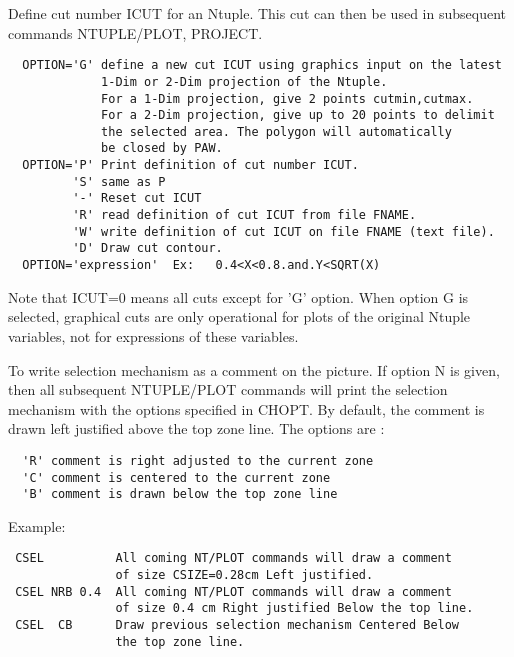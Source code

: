 \BEGARG
{}
\ENDARG
\BEGTEXT
Define cut number ICUT for an Ntuple.
This cut can then be used
in subsequent commands NTUPLE/PLOT, PROJECT.
\begin{verbatim}
  OPTION='G' define a new cut ICUT using graphics input on the latest
             1-Dim or 2-Dim projection of the Ntuple.
             For a 1-Dim projection, give 2 points cutmin,cutmax.
             For a 2-Dim projection, give up to 20 points to delimit
             the selected area. The polygon will automatically
             be closed by PAW.
  OPTION='P' Print definition of cut number ICUT.
         'S' same as P
         '-' Reset cut ICUT
         'R' read definition of cut ICUT from file FNAME.
         'W' write definition of cut ICUT on file FNAME (text file).
         'D' Draw cut contour.
  OPTION='expression'  Ex:   0.4<X<0.8.and.Y<SQRT(X)
\end{verbatim}
Note that ICUT=0 means all cuts except for 'G' option.
When option G is selected, graphical cuts are only operational
for plots of the original Ntuple variables, not for expressions
of these variables.
\ENDTEXT

\BEGARG
{}
\ENDARG
\BEGTEXT
To write selection mechanism as a comment on the picture.
If option N is given, then all subsequent NTUPLE/PLOT commands
will print the selection mechanism with the options specified in CHOPT.
By default, the comment is drawn left justified above the top zone line.
The options are :
\begin{verbatim}
  'R' comment is right adjusted to the current zone
  'C' comment is centered to the current zone
  'B' comment is drawn below the top zone line
\end{verbatim}
Example:
\begin{verbatim}
 CSEL          All coming NT/PLOT commands will draw a comment
               of size CSIZE=0.28cm Left justified.
 CSEL NRB 0.4  All coming NT/PLOT commands will draw a comment
               of size 0.4 cm Right justified Below the top line.
 CSEL  CB      Draw previous selection mechanism Centered Below
               the top zone line.
\end{verbatim}
\ENDTEXT

